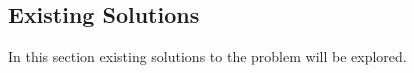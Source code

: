 \subsection{Existing Solutions}

In this section existing solutions to the problem will be explored.



